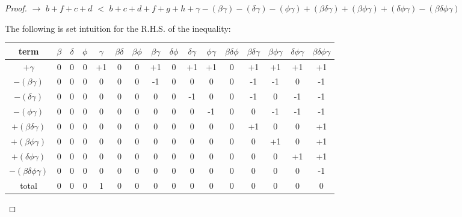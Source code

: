 \documentclass[manuscript]{acmart}
\begin{document}
\begin{proof}
        $\rightarrow$
        $b + f + c + d$
        $<$
        $b + c + d + f + g + h 
        + \gamma
        - (\beta \gamma) - (\delta \gamma) - (\phi \gamma)
        + (\beta \delta \gamma) + (\beta \phi \gamma) + (\delta \phi \gamma)
        - (\beta \delta \phi \gamma)
        $

        The following is set intuition for the R.H.S. of the inequality:

        \begin{center}
            \begin{tabular}{ |c|c|c|c|c|c|c|c|c|c|c|c|c|c|c|c| }
                \hline
                term & $\beta$ & $\delta$ & $\phi$ & $\gamma$ & 
                $\beta \delta$ & $\beta \phi$ & $\beta \gamma$ & 
                $\delta \phi$ & $\delta \gamma$ & $\phi \gamma$ &
                $\beta \delta \phi$ & $\beta \delta \gamma$ &
                $\beta \phi \gamma$ & $\delta \phi \gamma$ &
                $\beta \delta \phi \gamma$\\
                \hline
                $ + \gamma$ & 0 & 0 & 0 & +1 & 0 & 0 & +1 & 0 & +1 & +1 & 0 & +1 & +1 & +1 & +1 \\
                \hline
                $- (\beta \gamma)$ & 0 & 0 & 0 & 0 & 0 & 0 & -1 & 0 & 0 & 0 & 0 & -1 & -1 & 0 & -1 \\
                \hline
                $- (\delta \gamma)$ & 0 & 0 & 0 & 0 & 0 & 0 & 0 & 0 & -1 & 0 & 0 & -1 & 0 & -1 & -1 \\
                \hline
                $- (\phi \gamma)$ & 0 & 0 & 0 & 0 & 0 & 0 & 0 & 0 & 0 & -1 & 0 & 0 & -1 & -1 & -1 \\
                \hline
                $+ (\beta \delta \gamma)$ & 0 & 0 & 0 & 0 & 0 & 0 & 0 & 0 & 0 & 0 & 0 & +1 & 0 & 0 & +1 \\
                \hline
                $+ (\beta \phi \gamma)$ & 0 & 0 & 0 & 0 & 0 & 0 & 0 & 0 & 0 & 0 & 0 & 0 & +1 & 0 & +1 \\
                \hline
                $+ (\delta \phi \gamma)$ & 0 & 0 & 0 & 0 & 0 & 0 & 0 & 0 & 0 & 0 & 0 & 0 & 0 & +1 & +1 \\
                \hline
                $- (\beta \delta \phi \gamma)$ & 0 & 0 & 0 & 0 & 0 & 0 & 0 & 0 & 0 & 0 & 0 & 0 & 0 & 0 & -1 \\
                \hline
                total & 0 & 0 & 0 & 1 & 0 & 0 & 0 & 0 & 0 & 0 & 0 & 0 & 0 & 0 & 0 \\
                \hline
            \end{tabular}
        \end{center}


\end{proof}
\end{document}
